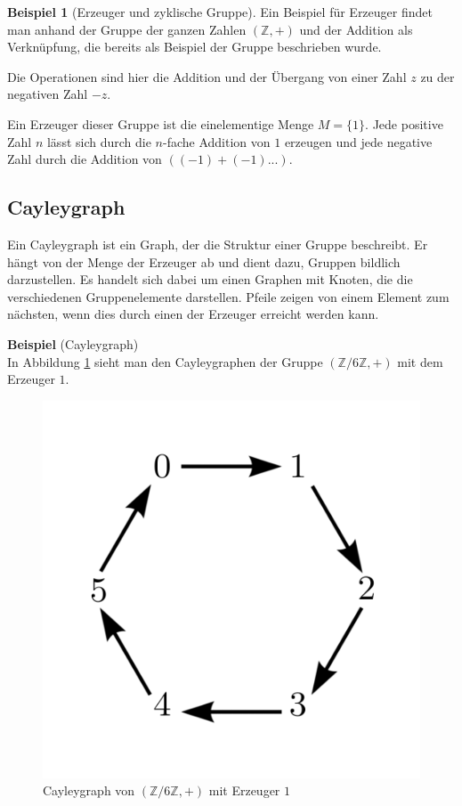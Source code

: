 \documentclass[12pt,a4paper, usenames, dvipsnames]{article}
\theoremstyle{mystyle}
\theoremstyle{definition}
\newtheorem{bsp}{Beispiel}[definition]
\begin{document}
\begin{bsp}[Erzeuger und zyklische Gruppe]

Ein Beispiel für Erzeuger findet man anhand der Gruppe der ganzen Zahlen $(\mathbb{Z},+)$ und der Addition als Verknüpfung, die bereits als Beispiel der Gruppe beschrieben wurde.

Die Operationen sind hier die Addition und der Übergang von einer Zahl $z$ zu der negativen Zahl $-z$.

Ein Erzeuger dieser Gruppe ist die einelementige Menge $M = \{ 1 \}$. Jede positive Zahl $n$ lässt sich durch die $n$-fache Addition von $1$ erzeugen und jede negative Zahl durch  die Addition von $((-1)+(-1)...)$. 

\end{bsp}
%
%
%
%
%
%
%
%
%
\subsection*{Cayleygraph} 
Ein Cayleygraph ist ein Graph, der die Struktur einer Gruppe beschreibt. Er hängt von der Menge der Erzeuger ab und dient dazu, Gruppen bildlich darzustellen.
Es handelt sich dabei um einen Graphen mit Knoten, die die verschiedenen Gruppenelemente darstellen. Pfeile zeigen von einem Element zum nächsten, wenn dies durch einen der Erzeuger erreicht werden kann. \cite{AT}

\textbf{Beispiel} (Cayleygraph) \\
In Abbildung \ref{34} sieht man den Cayleygraphen der Gruppe $(\mathbb{Z}/6\mathbb{Z}, +)$ mit dem Erzeuger $1$.

\begin{figure}[H]
\centering
\includegraphics[scale=0.7]{Cayleygraph3.png}
\caption{Cayleygraph von $(\mathbb{Z}/6\mathbb{Z}, +)$ mit Erzeuger $1$}
\label{34}
\end{figure}
\end{document}
